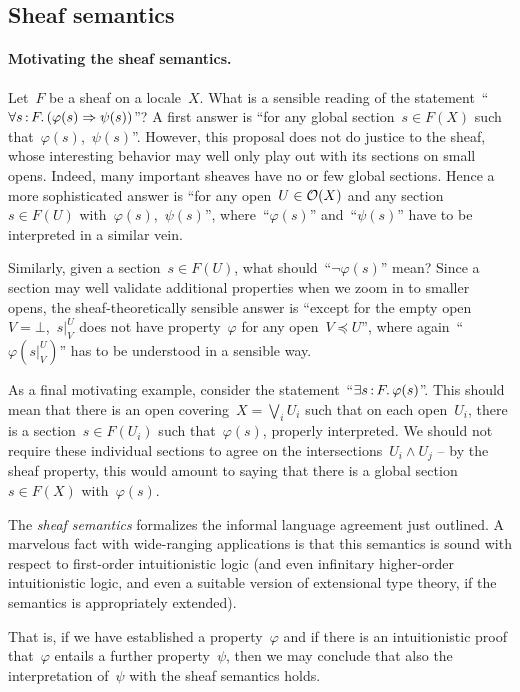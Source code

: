 \documentclass{ws-rv9x6}
\begin{document}
{\subsection{Sheaf semantics}
\label{sect:sheaf-semantics}

\paragraph{Motivating the sheaf semantics.} Let~$F$ be a sheaf on a locale~$X$.
What is a sensible reading of the statement~``$\forall s\,{:}\,F\mathpunct{.} (\varphi(s)
\Rightarrow \psi(s))$''? A first answer is ``for any global section~$s \in
F(X)$ such that~$\varphi(s)$,~$\psi(s)$''. However, this proposal does not do
justice to the sheaf, whose interesting behavior may well only play out with
its sections on small opens. Indeed, many important sheaves have no or few
global sections. Hence a more sophisticated answer is ``for any open~$U \in
\mathcal{O}(X)$ and any section~$s \in F(U)$ with~$\varphi(s)$,~$\psi(s)$'',
where~``$\varphi(s)$'' and~``$\psi(s)$'' have to be interpreted in a similar
vein.

Similarly, given a section~$s \in F(U)$, what should~``$\neg\varphi(s)$'' mean?
Since a section may well validate additional properties when we zoom in to
smaller opens, the sheaf-theoretically sensible answer is ``except for the
empty open~$V = \bot$,~$s|^U_V$ does not have property~$\varphi$ for any
open~$V \preceq U$'', where again~``$\varphi(s|^U_V)$'' has to be understood in a
sensible way.

As a final motivating example, consider the statement~``$\exists s\,{:}\,F\mathpunct{.}
\varphi(s)$''. This should mean that there is an open covering~$X = \bigvee_i
U_i$ such that on each open~$U_i$, there is a section~$s \in F(U_i)$ such
that~$\varphi(s)$, properly interpreted. We should not require these individual
sections to agree on the intersections~$U_i \wedge U_j$ -- by the sheaf
property, this would amount to saying that there is a global section~$s \in
F(X)$ with~$\varphi(s)$.

The \emph{sheaf semantics} formalizes the informal language agreement just
outlined. A marvelous fact with wide-ranging applications is that this
semantics is sound with respect to first-order intuitionistic logic (and even
infinitary higher-order intuitionistic logic, and even a suitable version of
extensional type theory, if the semantics is appropriately extended).

That is, if we have established a property~$\varphi$ and if there is an
intuitionistic proof that~$\varphi$ entails a further property~$\psi$, then we
may conclude that also the interpretation of~$\psi$ with the sheaf semantics
holds.

}
\end{document}
